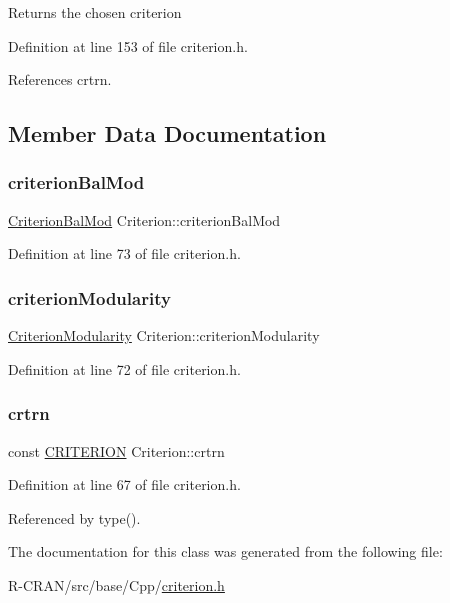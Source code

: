 \begin{DoxyReturn}{Returns}
the chosen criterion 
\end{DoxyReturn}


Definition at line 153 of file criterion.\+h.



References crtrn.



\subsection{Member Data Documentation}
\mbox{\label{classCriterion_a164dd99a6707997bb916a1516e1cd327}} 
\subsubsection{\texorpdfstring{criterion\+Bal\+Mod}{criterionBalMod}}
{\footnotesize\ttfamily \hyperlink{classCriterionBalMod}{Criterion\+Bal\+Mod} Criterion\+::criterion\+Bal\+Mod\hspace{0.3cm}{\ttfamily [private]}}



Definition at line 73 of file criterion.\+h.

\mbox{\label{classCriterion_ae3432ace13d3191c7f6f33c833eb3b82}} 
\subsubsection{\texorpdfstring{criterion\+Modularity}{criterionModularity}}
{\footnotesize\ttfamily \hyperlink{classCriterionModularity}{Criterion\+Modularity} Criterion\+::criterion\+Modularity\hspace{0.3cm}{\ttfamily [private]}}



Definition at line 72 of file criterion.\+h.

\mbox{\label{classCriterion_af38092427520b56e2301f14e7fc71dbb}} 
\subsubsection{\texorpdfstring{crtrn}{crtrn}}
{\footnotesize\ttfamily const \hyperlink{classCriterion_a55594c223ce0837b8319c46c66cb648f}{C\+R\+I\+T\+E\+R\+I\+ON} Criterion\+::crtrn\hspace{0.3cm}{\ttfamily [private]}}



Definition at line 67 of file criterion.\+h.



Referenced by type().



The documentation for this class was generated from the following file\+:\begin{DoxyCompactItemize}
\item 
R-\/\+C\+R\+A\+N/src/base/\+Cpp/\hyperlink{criterion_8h}{criterion.\+h}\end{DoxyCompactItemize}

